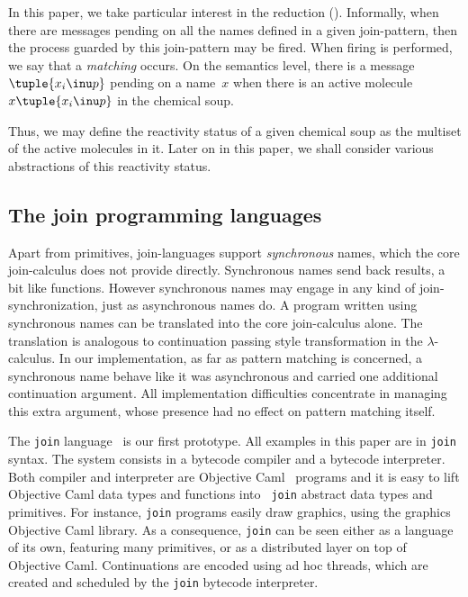 In this paper, we take particular interest in the reduction ().
Informally, when there are messages pending on all the names defined
in a given join-pattern, then the process guarded by this join-pattern
may be fired. When firing is performed, we say that a {\em matching} occurs.
On the semantics level, there is a message $\tuple{x_i\inu p}$ pending
on a name~$x$ when there is an active molecule
~$x\tuple {x_i\inu p}$ in the chemical soup.

Thus, we may define the reactivity status of a given chemical soup as
the multiset of the active molecules in it.
Later on in this paper, we shall consider various abstractions of this
reactivity status.


\subsection{The join programming languages}

Apart from primitives, join-languages support {\em synchronous}
names, which the core join-calculus does not provide directly.
Synchronous names send back results, a bit like functions.
However synchronous names may engage in any kind of
join-synchronization, just as asynchronous names do.
A program written using synchronous names can be translated
into the core join-calculus alone. 
The translation is analogous to continuation passing style
transformation in the $\lambda$-calculus.
In our implementation, as far as pattern matching is concerned,
a synchronous name
behave like it was asynchronous and carried one additional continuation
argument. All implementation difficulties concentrate in managing this extra
argument, whose presence had no effect on pattern matching itself.



The {\tt join} language~\cite{Join} is our first prototype. All
examples in this paper are in {\tt join} syntax.  The system consists
in a bytecode compiler and a bytecode interpreter.  Both compiler and
interpreter are Objective Caml~\cite{Objective-Caml} programs and it
is easy to lift Objective Caml data types and functions into {\tt
  join} abstract data types and primitives.  For instance, {\tt join}
programs easily draw graphics, using the graphics Objective Caml
library.  As a consequence, {\tt join} can be seen either as a
language of its own, featuring many primitives, or as a distributed
layer on top of Objective Caml.  Continuations are encoded using
ad hoc threads, which are created and scheduled by the {\tt join}
bytecode interpreter.


